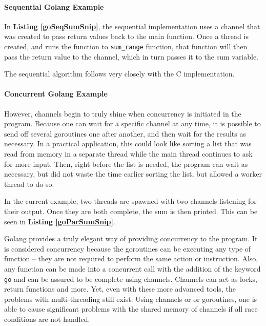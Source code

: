 \documentclass[12pt]{article}
\newcommand{\code}[1]{\lstinline[]{#1}}
\newcommand{\codeRef}[1]{\textbf{Listing \ref{#1}}}
\begin{document}
\paragraph{Sequential Golang Example} 

In \codeRef{goSeqSumSnip}, the sequential implementation uses a channel that was created to pass return values back to the main function. Once a thread is created, and runs the function to \code{sum_range} function, that function will then pass the return value to the channel, which in turn passes it to the sum variable.



The sequential algorithm follows very closely with the C implementation.

\paragraph{Concurrent Golang Example}

However, channels begin to truly shine when concurrency is initiated in the program. Because one can wait for a specific channel at any time, it is possible to send off several goroutines one after another, and then wait for the results as necessary. In a practical application, this could look like sorting a list that was read from memory in a separate thread while the main thread continues to ask for more input. Then, right before the list is needed, the program can wait as necessary, but did not waste the time earlier sorting the list, but allowed a worker thread to do so.

In the current example, two threads are spawned with two channels listening for their output. Once they are both complete, the sum is then printed. This can be seen in \codeRef{goParSumSnip}. 



Golang provides a truly elegant way of providing concurrency to the program. It is considered concurrency because the goroutines can be executing any type of function -- they are not required to perform the same action or instruction. Also, any function can be made into a concurrent call with the addition of the keyword \code{go} and can be assured to be complete using channels. Channels can act as locks, return functions and more. Yet, even with these more advanced tools, the problems with multi-threading still exist. Using channels or or goroutines, one is able to cause significant problems with the shared memory of channels if all race conditions are not handled. 
\end{document}

